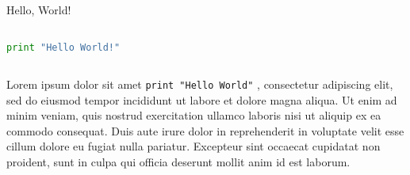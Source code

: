 \documentclass[a4paper]{article}
\begin{document}
Hello, World!

\begin{lstlisting}[language=Python]

print "Hello World!"
    
\end{lstlisting}



Lorem ipsum dolor sit amet \lstinline{print "Hello World"} , consectetur adipiscing elit, sed do eiusmod tempor incididunt ut labore et dolore magna aliqua. Ut enim ad minim veniam, quis nostrud exercitation ullamco laboris nisi ut aliquip ex ea commodo consequat. Duis aute irure dolor in reprehenderit in voluptate velit esse cillum dolore eu fugiat nulla pariatur. Excepteur sint occaecat cupidatat non proident, sunt in culpa qui officia deserunt mollit anim id est laborum.
\end{document}
